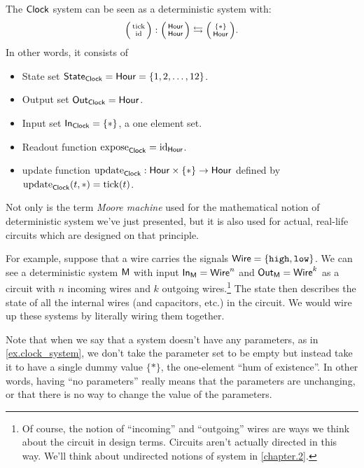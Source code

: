 \documentclass[DynamicalBook]{subfiles}
\begin{document}
\begin{example}\label{ex.clock_system}
  The $\mathsf{Clock}$ system can be seen as a deterministic system with:
  $$\lens{\fun{tick}}{\id} : \lens{\Set{Hour}}{\Set{Hour}} \fromto \lens{\{\ast\}}{\Set{Hour}}.$$
  In other words, it consists of
  \begin{itemize}
  \item State set $\mathsf{State}_{\mathsf{Clock}} = \mathsf{Hour} =\{1,2,\ldots,12\}$.
  \item Output set $\mathsf{Out}_{\mathsf{Clock}} = \mathsf{Hour}$.
  \item Input set $\mathsf{In}_{\mathsf{Clock}} = \{\ast\}$, a one element set.
  \item Readout function $\mathrm{expose}_{\mathsf{Clock}} = \mathrm{id}_{\mathsf{Hour}}$.
  \item update function $\mathrm{update}_{\mathsf{Clock}} : \mathsf{Hour} \times \{\ast\} \to \mathsf{Hour}$
    defined by $\mathrm{update}_{\mathsf{Clock}}(t, \ast) = \mathrm{tick}(t)$.
  \end{itemize}
\end{example}

\begin{example}\label{ex.moore_machine}
  Not only is the term \emph{Moore machine} used for the mathematical notion of
  deterministic system we've just presented, but it is also used for actual,
  real-life circuits which are designed on that principle.

  For example, suppose that a wire carries the signals $\mathsf{Wire} =
  \{\mathtt{high}, \mathtt{low}\}$. We can see a deterministic system $\mathsf{M}$
  with input $\mathsf{In}_{\mathsf{M}} = \mathsf{Wire}^n$ and $\mathsf{Out}_{\mathsf{M}} = \mathsf{Wire}^k$ as a circuit
  with $n$ incoming wires and $k$ outgoing wires.\footnote{Of course, the notion
  of ``incoming'' and ``outgoing'' wires are ways we think about the circuit in
  design terms. Circuits aren't actually directed in this way. We'll think about
undirected notions of system in \cref{chapter.2}.} The state then describes the
state of all the internal wires (and capacitors, etc.) in the circuit. We would wire up these systems by literally wiring them together. 

\end{example}

Note that when we say that a system doesn't have any parameters, as in \cref{ex.clock_system}, we don't take the
parameter set to be empty but instead take it to have a single dummy value $\{*\}$, the one-element ``hum of existence''. In other words, having ``no parameters'' really means that the parameters are unchanging, or that there is no way to change the value of the parameters.
\end{document}
